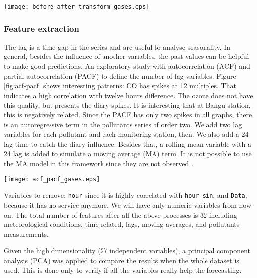 \begin{figure*}
    \centering
    \texttt{[image: before\_after\_transform\_gases.eps]}
    \caption{Gases distribution before and after the power transform.}
    \label{fig:before-after-transform}
\end{figure*}
 
\subsubsection{Feature extraction}

The lag is a time gap in the series and are useful to analyse seasonality. In
general, besides the influence of another variables, the past values can be
helpful to make good predictions. An exploratory study with autocorrelation
(ACF) and partial autocorrelation (PACF) to define the number of lag
variables. Figure \ref{fig:acf-pacf} shows interesting patterns: CO has spikes
at 12 multiples. That indicates a high correlation with twelve hours
difference. The ozone does not have this quality, but presents the diary
spikes. It is interesting that at Bangu station, this is negatively related.
Since the PACF has only two spikes in all graphs, there is an autoregressive
term in the pollutants series of order two. We add two lag variables for each
pollutant and each monitoring station, then. We also add a 24 lag time to
catch the diary influence. Besides that, a rolling mean variable with a 24 lag
is added to simulate a moving average (MA) term. It is not possible to use the MA
model in this framework since they are not observed \cite{liang2020machine}. 

\begin{figure*}
    \centering
    \texttt{[image: acf\_pacf\_gases.eps]}
    \caption{ACF and PACF plots for CO, O$_3$, and PM$_{10}$ at Copacabana and
    Bangu stations. }
    \label{fig:acf-pacf}
\end{figure*}

Variables to remove: {\tt hour} since it is highly correlated with {\tt hour\_sin}, and {\tt Data}, because it has no service anymore. We will have
only numeric variables from now on. The total number of features after all
the above processes is 32 including meteorological conditions, time-related,
lags, moving averages, 
and pollutants measurements.

Given the high dimensionality (27 independent variables), a principal
component analysis (PCA) was applied to compare the results when the whole
dataset is used. This is done only to verify if all the variables really help
the forecasting. 